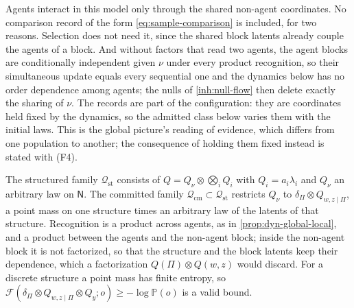 Agents interact in this model only through the shared non-agent coordinates.
No comparison record of the form \cref{eq:sample-comparison} is included,
for two reasons. Selection does not need it, since the shared block latents
already couple the agents of a block. And without factors that read two
agents, the agent blocks are conditionally independent given $\nu$ under
every product recognition, so their simultaneous update equals every
sequential one and the dynamics below has no order dependence among agents;
the nulls of \cref{inh:null-flow} then delete exactly the sharing of $\nu$.
The records are part of the configuration: they are coordinates held fixed
by the dynamics, so the admitted class below varies them with the initial
laws. This is the global picture's reading of evidence, which differs from
one population to another; the consequence of holding them fixed instead is
stated with (F4).

The structured family $\mathcal Q_{\mathrm{st}}$ consists of
$Q=Q_\nu\otimes\bigotimes_iQ_i$ with $Q_i=a_i\lambda_i$ and $Q_\nu$ an
arbitrary law on $\mathsf N$. The committed family
$\mathcal Q_{\mathrm{cm}}\subset\mathcal Q_{\mathrm{st}}$ restricts $Q_\nu$ to
$\delta_\Pi\otimes Q_{w,z\mid\Pi}$, a point mass on one structure times an
arbitrary law of the latents of that structure. Recognition is a product
across agents, as in \cref{prop:dyn-global-local}, and a product between the
agents and the non-agent block; inside the non-agent block it is not
factorized, so that the structure and the block latents keep their
dependence, which a factorization $Q(\Pi)\otimes Q(w,z)$ would discard. For
a discrete structure a point mass has finite entropy, so
$\mathcal F(\delta_\Pi\otimes Q_{w,z\mid\Pi}\otimes Q_y;o)\geq-\log\mathbb P(o)$
is a valid bound.

